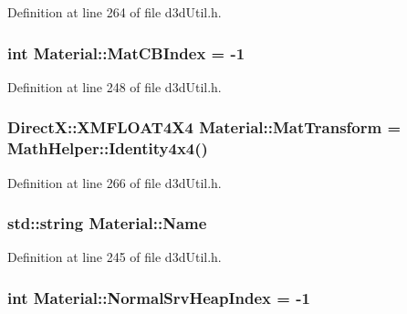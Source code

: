 Definition at line 264 of file d3d\+Util.\+h.

\subsubsection[{\texorpdfstring{Mat\+C\+B\+Index}{MatCBIndex}}]{\setlength{\rightskip}{0pt plus 5cm}int Material\+::\+Mat\+C\+B\+Index = -\/1}\hypertarget{struct_material_a7bafa2db0678ffe18c5e51f3d0e45df9_a7bafa2db0678ffe18c5e51f3d0e45df9}{}\label{struct_material_a7bafa2db0678ffe18c5e51f3d0e45df9_a7bafa2db0678ffe18c5e51f3d0e45df9}


Definition at line 248 of file d3d\+Util.\+h.

\subsubsection[{\texorpdfstring{Mat\+Transform}{MatTransform}}]{\setlength{\rightskip}{0pt plus 5cm}Direct\+X\+::\+X\+M\+F\+L\+O\+A\+T4\+X4 Material\+::\+Mat\+Transform = {\bf Math\+Helper\+::\+Identity4x4}()}\hypertarget{struct_material_a3fd206fc6ecb51634475f22ff17528d0_a3fd206fc6ecb51634475f22ff17528d0}{}\label{struct_material_a3fd206fc6ecb51634475f22ff17528d0_a3fd206fc6ecb51634475f22ff17528d0}


Definition at line 266 of file d3d\+Util.\+h.

\subsubsection[{\texorpdfstring{Name}{Name}}]{\setlength{\rightskip}{0pt plus 5cm}std\+::string Material\+::\+Name}\hypertarget{struct_material_a793dc9034c137caf3d8b3b4b0f9d451b_a793dc9034c137caf3d8b3b4b0f9d451b}{}\label{struct_material_a793dc9034c137caf3d8b3b4b0f9d451b_a793dc9034c137caf3d8b3b4b0f9d451b}


Definition at line 245 of file d3d\+Util.\+h.

\subsubsection[{\texorpdfstring{Normal\+Srv\+Heap\+Index}{NormalSrvHeapIndex}}]{\setlength{\rightskip}{0pt plus 5cm}int Material\+::\+Normal\+Srv\+Heap\+Index = -\/1}\hypertarget{struct_material_af6139531ff098c78d4d03d2fa232f27e_af6139531ff098c78d4d03d2fa232f27e}{}\label{struct_material_af6139531ff098c78d4d03d2fa232f27e_af6139531ff098c78d4d03d2fa232f27e}


